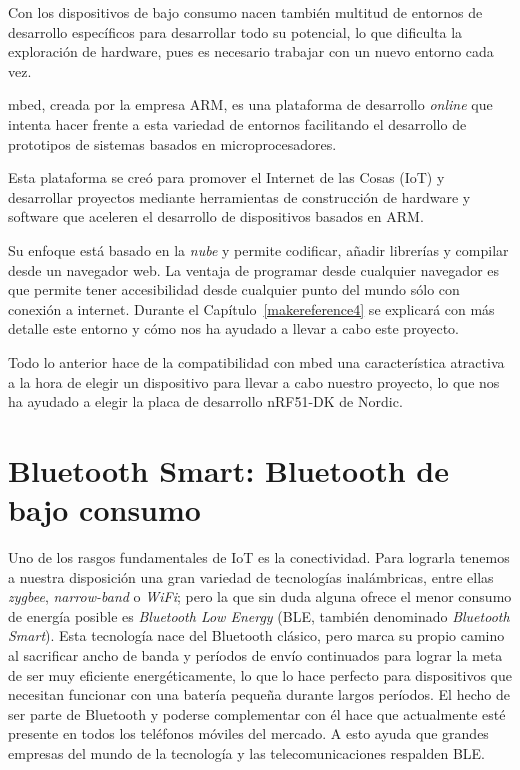 Con los dispositivos de bajo consumo nacen también multitud de entornos de desarrollo específicos para desarrollar todo su potencial, lo que dificulta la exploración de hardware, pues es necesario trabajar con un nuevo entorno cada vez. 

mbed, creada por la empresa ARM, es una plataforma de desarrollo \textit{online} que intenta hacer frente a esta variedad de entornos facilitando el desarrollo de prototipos de sistemas basados en microprocesadores.

Esta plataforma se creó para promover el Internet de las Cosas (IoT) y desarrollar proyectos mediante herramientas de construcción de hardware y software que aceleren el desarrollo de dispositivos basados en ARM.

Su enfoque está basado en la \textit{nube} y permite codificar, añadir librerías y compilar desde un navegador web. La ventaja de programar desde cualquier navegador es que permite tener accesibilidad desde cualquier punto del mundo sólo con conexión a internet. Durante el Capítulo~\ref{makereference4} se explicará con más detalle este entorno y cómo nos ha ayudado a llevar a cabo este proyecto.

Todo lo anterior hace de la compatibilidad con mbed una característica atractiva a la hora de elegir un dispositivo para llevar a cabo nuestro proyecto, lo que nos ha ayudado a elegir la placa de desarrollo nRF51-DK de Nordic.

\section{Bluetooth Smart: Bluetooth de bajo consumo}
\label{makereference1.2}

Uno de los rasgos fundamentales de IoT es la conectividad. Para lograrla tenemos a nuestra disposición una gran variedad de tecnologías inalámbricas, entre ellas \textit{zygbee}, \textit{narrow-band} o \textit{WiFi}; pero la que sin duda alguna ofrece el menor consumo de energía posible es \textit{Bluetooth Low Energy} (BLE, también denominado \textit{Bluetooth Smart}). 
Esta tecnología nace del Bluetooth clásico, pero marca su propio camino al sacrificar ancho de banda y períodos de envío continuados para lograr la meta de ser muy eficiente energéticamente, lo que lo hace perfecto para dispositivos que necesitan funcionar con una batería pequeña durante largos períodos. El hecho de ser parte de Bluetooth y poderse complementar con él hace que actualmente esté presente en todos los teléfonos móviles del mercado. A esto ayuda que grandes empresas del mundo de la tecnología y las telecomunicaciones respalden BLE.

